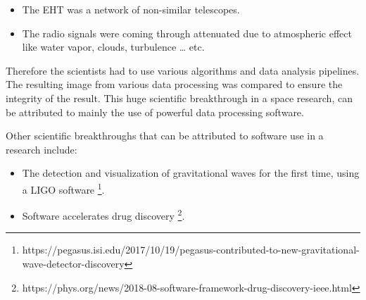 \vspace{-1mm}   %
	\begin{itemize}%
		\item The EHT was a network of non-similar telescopes.
		\item The radio signals were coming through attenuated due to atmospheric effect like water vapor, clouds, turbulence … etc.
	\end{itemize}
Therefore the scientists had to use various algorithms and data analysis pipelines. The resulting image from various data processing was compared to ensure the integrity of the result. This huge scientific breakthrough in a space research, can be attributed to mainly the use of powerful data processing software. 

Other scientific breakthroughs that can be attributed to software use in a research include:

	\vspace{-1mm}   %
	\begin{itemize}%
		\item The detection and visualization of gravitational waves for the first time, using a LIGO software \citep{enwiki:1047100294}\footnote{https://pegasus.isi.edu/2017/10/19/pegasus-contributed-to-new-gravitational-wave-detector-discovery}. 
		\item Software accelerates drug discovery \footnote{https://phys.org/news/2018-08-software-framework-drug-discovery-ieee.html}.
	\end{itemize}


